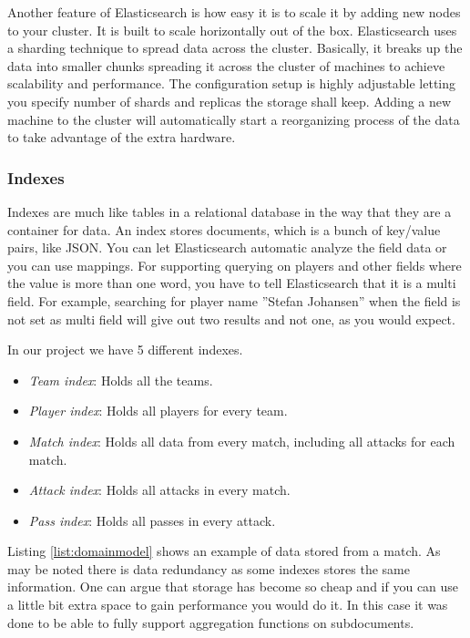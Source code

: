 Another feature of Elasticsearch is how easy it is to scale it by adding new nodes to your cluster. It is built to scale horizontally out of the box. Elasticsearch uses a sharding technique to spread data across the cluster.  Basically, it breaks up the data into smaller chunks spreading it across the cluster of machines to achieve scalability and performance. The configuration setup is highly adjustable letting you specify number of shards and replicas the storage shall keep. Adding a new machine to the cluster will automatically start a reorganizing process of the data to take advantage of the extra hardware. 


\subsubsection{Indexes}

Indexes are much like tables in a relational database in the way that they are a container for data. An index stores documents, which is a bunch of key/value pairs, like \ac{JSON}. You can let Elasticsearch automatic analyze the field data or you can use mappings. For supporting querying on players and other fields where the value is more than one word, you have to tell Elasticsearch that it is a multi field. For example, searching for player name ''Stefan Johansen'' when the field is not set as multi field will give out two results and not one, as you would expect.

In our project we have 5 different indexes. 
\begin{itemize}
\item \emph{Team index}: Holds all the teams.
\item \emph{Player index}: Holds all players for every team.
\item \emph{Match index}: Holds all data from every match, including all attacks for each match.
\item \emph{Attack index}: Holds all attacks in every match.
\item \emph{Pass index}: Holds all passes in every attack.
\end{itemize}

Listing \ref{list:domainmodel} shows an example of data stored from a match. As may be noted there is data redundancy as some indexes stores the same information. One can argue that storage has become so cheap and if you can use a little bit extra space to gain performance you would do it. In this case it was done to be able to fully support aggregation functions on subdocuments.


